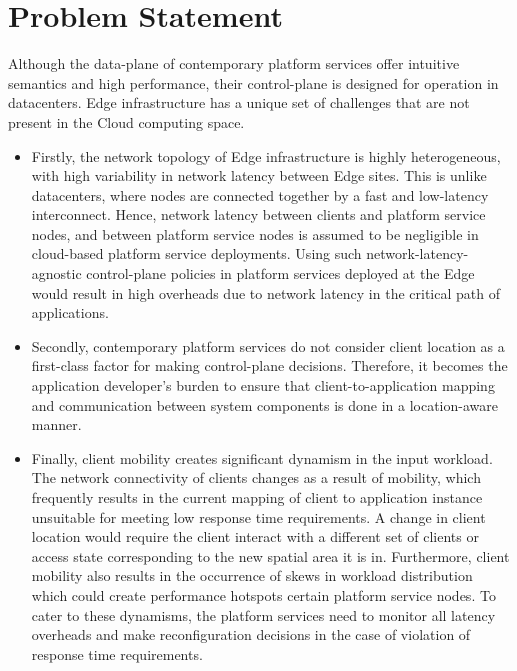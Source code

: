 \section{Problem Statement}

Although the data-plane of contemporary platform services offer intuitive semantics and high performance, their control-plane is designed for operation in datacenters. Edge infrastructure has a unique set of challenges that are not present in the Cloud computing space.
\begin{itemize}
    \item Firstly, the network topology of Edge infrastructure is highly heterogeneous, with high variability in network latency between Edge sites. This is unlike datacenters, where nodes are connected together by a fast and low-latency interconnect. Hence, network latency between clients and platform service nodes, and between platform service nodes is assumed to be negligible in cloud-based platform service deployments. Using such network-latency-agnostic control-plane policies in platform services deployed at the Edge would result in high overheads due to network latency in the critical path of applications.
    \item Secondly, contemporary platform services do not consider client location as a first-class factor for making control-plane decisions. Therefore, it becomes the application developer's burden to ensure that client-to-application mapping and communication between system components is done in a location-aware manner.
    \item Finally, client mobility creates significant dynamism in the input workload. The network connectivity of clients changes as a result of mobility, which frequently results in the current mapping of client to application instance unsuitable for meeting low response time requirements. A change in client location would require the client interact with a different set of clients or access state corresponding to the new spatial area it is in. Furthermore, client mobility also results in the occurrence of skews in workload distribution which could create performance hotspots certain platform service nodes. To cater to these dynamisms, the platform services need to monitor all latency overheads and make reconfiguration decisions in the case of violation of response time requirements.
\end{itemize}


